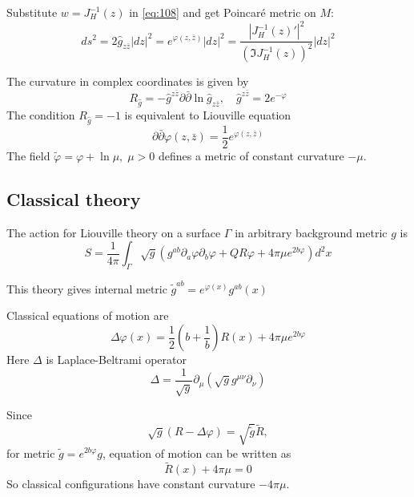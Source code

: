 \documentclass[12pt]{article}
\begin{document}
Substitute $w=J_{H}^{-1}(z)$ in \eqref{eq:108} and get Poincar\'e metric on $M$:
\begin{equation}
  \label{eq:109}
  ds^{2}=2\hat g_{z\bar z}|dz|^{2}=e^{\varphi(z,\bar z)} |dz|^{2}=\frac{|J_{H}^{-1}(z)'|^{2}}{(\Im
    J_{H}^{-1}(z))^{2}} |dz|^{2}
\end{equation}

The curvature in complex coordinates is given by
\begin{equation}
  \label{eq:110}
  R_{\hat g}=-\hat g^{z\bar z}\partial \bar \partial \ln \hat g_{z\bar z}, \quad \hat g^{z\bar z}=2e^{-\varphi}
\end{equation}
The condition $R_{\hat g}=-1$ is equivalent to Liouville equation
\begin{equation}
  \label{eq:111}
  \partial \bar \partial \varphi(z,\bar z)=\frac{1}{2} e^{\varphi(z,\bar z)}
\end{equation}
The field $\tilde\varphi=\varphi+\ln \mu, \; \mu>0$ defines a metric of constant curvature $-\mu$. 

\subsection{Classical theory}
\label{sec:classical-theory}

The action for Liouville theory on a surface $\Gamma$ in arbitrary background metric $g$ is
\begin{equation}
  \label{eq:13}
  S=\frac{1}{4\pi} \int_{\Gamma} \sqrt{g} \left( g^{ab} \partial_{a}\varphi \partial_{b}\varphi + Q R \varphi +4\pi \mu e^{2b\varphi}\right) d^{2}x
\end{equation}

This theory gives internal metric $\tilde g^{ab}=e^{\varphi(x)}g^{ab}(x)$


Classical equations of motion are
\begin{equation}
  \label{eq:16}
  \Delta \varphi(x) = \frac{1}{2} \left(b+\frac{1}{b}\right) R (x) + 4\pi \mu e^{2 b \varphi}
\end{equation}
Here $\Delta$ is Laplace-Beltrami operator
\begin{equation}
  \label{eq:17}
  \Delta=\frac{1}{\sqrt{g}}\partial_{\mu} \left(\sqrt{g} g^{\mu\nu} \partial_{\nu}\right)
\end{equation}

Since
\begin{equation}
  \label{eq:93}
  \sqrt{g}(R-\Delta \varphi)=\sqrt{\tilde g} \tilde R, 
\end{equation}
for metric $\tilde g= e^{2b\varphi} g$, equation of motion can be written as
\begin{equation}
  \label{eq:94}
  \tilde R(x) + 4\pi \mu=0
\end{equation}
So classical configurations have constant curvature $-4\pi\mu$.
\end{document}
